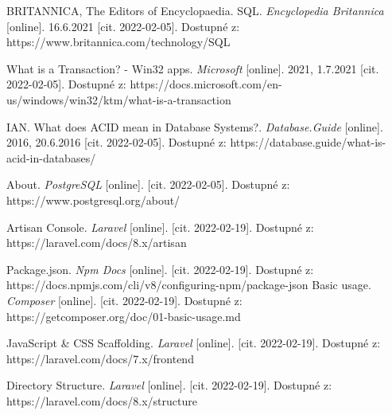 \begin{thebibliography}{50}
BRITANNICA, The Editors of Encyclopaedia. SQL. \textit{Encyclopedia Britannica} [online]. 16.6.2021 [cit. 2022-02-05]. Dostupné z: https://www.britannica.com/technology/SQL

What is a Transaction? - Win32 apps. \textit{Microsoft} [online]. 2021, 1.7.2021 [cit. 2022-02-05]. Dostupné z: https://docs.microsoft.com/en-us/windows/win32/ktm/what-is-a-transaction

IAN. What does ACID mean in Database Systems?. \textit{Database.Guide} [online]. 2016, 20.6.2016 [cit. 2022-02-05]. Dostupné z: https://database.guide/what-is-acid-in-databases/

About. \textit{PostgreSQL} [online]. [cit. 2022-02-05]. Dostupné z: https://www.postgresql.org/about/

Artisan Console. \textit{Laravel} [online]. [cit. 2022-02-19]. Dostupné z: https://laravel.com/docs/8.x/artisan

Package.json. \textit{Npm Docs} [online]. [cit. 2022-02-19]. Dostupné z: https://docs.npmjs.com/cli/v8/configuring-npm/package-json
Basic usage. \textit{Composer} [online]. [cit. 2022-02-19]. Dostupné z: https://getcomposer.org/doc/01-basic-usage.md

JavaScript \& CSS Scaffolding. \textit{Laravel} [online]. [cit. 2022-02-19]. Dostupné z: https://laravel.com/docs/7.x/frontend

Directory Structure. \textit{Laravel} [online]. [cit. 2022-02-19]. Dostupné z: https://laravel.com/docs/8.x/structure

\end{thebibliography}